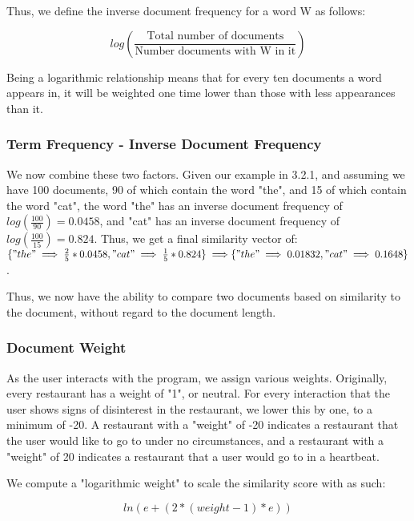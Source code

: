 \documentclass{article}
\begin{document}
            Thus, we define the inverse document frequency for a word W as follows:
            
            \begin{equation}
                log(\frac{\text{Total number of documents}}{\text{Number documents with W in it}})
            \end{equation}
        
            Being a logarithmic relationship means that for every ten documents a word appears in, it will be weighted one time lower than those with less appearances than it.
            
        \subsubsection{Term Frequency - Inverse Document Frequency}
            We now combine these two factors. Given our example in 3.2.1, and assuming we have 100 documents, 90 of which contain the word "the", and 15 of which contain the word "cat", the word "the" has an inverse document frequency of $log(\frac{100}{90})=0.0458$, and "cat" has an inverse document frequency of $log(\frac{100}{15})=0.824$. Thus, we get a final similarity vector of: $\{"the" \implies {\frac{2}{5} * 0.0458}, "cat" \implies {\frac{1}{5} * 0.824}\} \implies \\ \{"the" \implies 0.01832, "cat" \implies 0.1648\}$.
            
            Thus, we now have the ability to compare two documents based on similarity to the document, without regard to the document length.
        
        \subsubsection{Document Weight}
            As the user interacts with the program, we assign various weights. Originally, every restaurant has a weight of "1", or neutral. For every interaction that the user shows signs of disinterest in the restaurant, we lower this by one, to a minimum of -20. A restaurant with a "weight" of -20 indicates a restaurant that the user would like to go to under no circumstances, and a restaurant with a "weight" of 20 indicates a restaurant that a user would go to in a heartbeat.
        
        We compute a "logarithmic weight" to scale the similarity score with as such:
        
        \begin{equation}
            ln(e + (2 * (weight - 1) * e))
        \end{equation}
        
\end{document}
